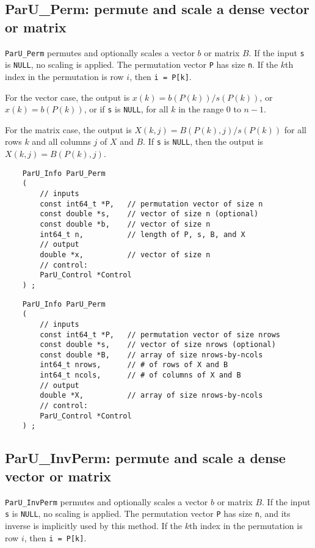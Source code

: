 \documentclass[12pt]{article}
\begin{document}
\subsection{{\sf ParU\_Perm}: permute and scale a dense vector or matrix}
\label{perm}

    \verb'ParU_Perm' permutes and optionally scales a vector $b$ or matrix $B$.
    If the input \verb's' is \verb'NULL', no scaling is applied.  The
    permutation vector \verb'P' has size \verb'n'.  If the $k$th index in the
    permutation is row $i$, then \verb'i = P[k]'.

    For the vector case, the output is $x(k) = b(P(k)) / s(P(k))$, or
    $x(k) = b(P(k))$, or if \verb's' is \verb'NULL', for all $k$ in the range 0
    to $n-1$.

    For the matrix case, the output is $X(k,j) = B(P(k),j) / s(P(k))$ for all
    rows $k$ and all columns $j$ of $X$ and $B$.  If \verb's' is \verb'NULL',
    then the output is $X(k,j) = B(P(k),j)$.

    {\footnotesize
    \begin{verbatim}
    ParU_Info ParU_Perm
    (
        // inputs
        const int64_t *P,   // permutation vector of size n
        const double *s,    // vector of size n (optional)
        const double *b,    // vector of size n
        int64_t n,          // length of P, s, B, and X
        // output
        double *x,          // vector of size n
        // control:
        ParU_Control *Control
    ) ; \end{verbatim} }

    {\footnotesize
    \begin{verbatim}
    ParU_Info ParU_Perm
    (
        // inputs
        const int64_t *P,   // permutation vector of size nrows
        const double *s,    // vector of size nrows (optional)
        const double *B,    // array of size nrows-by-ncols
        int64_t nrows,      // # of rows of X and B
        int64_t ncols,      // # of columns of X and B
        // output
        double *X,          // array of size nrows-by-ncols
        // control:
        ParU_Control *Control
    ) ; \end{verbatim} }

\subsection{{\sf ParU\_InvPerm}: permute and scale a dense vector or matrix}
\label{invperm}

    \verb'ParU_InvPerm' permutes and optionally scales a vector $b$ or matrix $B$.
    If the input \verb's' is \verb'NULL', no scaling is applied.  The
    permutation vector \verb'P' has size \verb'n', and its inverse is
    implicitly used by this method.  If the $k$th index in the permutation is
    row $i$, then \verb'i = P[k]'.
\end{document}
